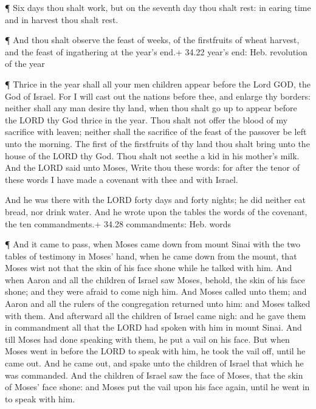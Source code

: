  ¶ Six days thou shalt work, but on the seventh day thou
shalt rest: in earing time and in harvest thou shalt rest.

 ¶ And thou shalt observe the feast of weeks, of the
firstfruits of wheat harvest, and the feast of ingathering at the year's
end.+ 34.22 year's end: Heb. revolution of the year

 ¶ Thrice in the year shall all your men children appear
before the Lord GOD, the God of Israel.  For I will cast
out the nations before thee, and enlarge thy borders: neither shall any
man desire thy land, when thou shalt go up to appear before the LORD thy
God thrice in the year.  Thou shalt not offer the blood of
my sacrifice with leaven; neither shall the sacrifice of the feast of
the passover be left unto the morning.  The first of the
firstfruits of thy land thou shalt bring unto the house of the LORD thy
God. Thou shalt not seethe a kid in his mother's milk.  And
the LORD said unto Moses, Write thou these words: for after the tenor of
these words I have made a covenant with thee and with Israel.

 And he was there with the LORD forty days and forty
nights; he did neither eat bread, nor drink water. And he wrote upon the
tables the words of the covenant, the ten commandments.+ 34.28
commandments: Heb. words

 ¶ And it came to pass, when Moses came down from mount
Sinai with the two tables of testimony in Moses' hand, when he came down
from the mount, that Moses wist not that the skin of his face shone
while he talked with him.  And when Aaron and all the
children of Israel saw Moses, behold, the skin of his face shone; and
they were afraid to come nigh him.  And Moses called unto
them; and Aaron and all the rulers of the congregation returned unto
him: and Moses talked with them.  And afterward all the
children of Israel came nigh: and he gave them in commandment all that
the LORD had spoken with him in mount Sinai.  And till
Moses had done speaking with them, he put a vail on his face.
 But when Moses went in before the LORD to speak with him,
he took the vail off, until he came out. And he came out, and spake unto
the children of Israel that which he was commanded.  And
the children of Israel saw the face of Moses, that the skin of Moses'
face shone: and Moses put the vail upon his face again, until he went in
to speak with him.

